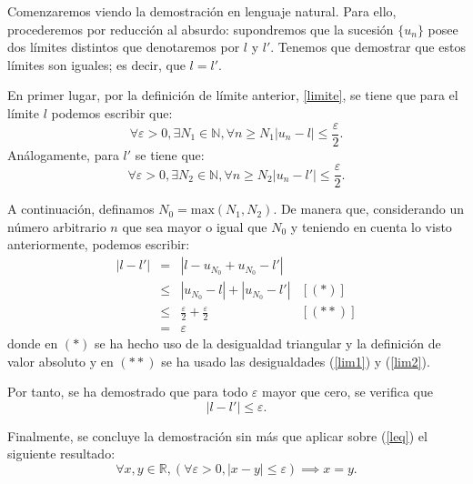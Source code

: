 \begin{demostracion}
  Comenzaremos viendo la demostración en lenguaje natural. Para ello,
  procederemos por reducción al absurdo: supondremos que la sucesión
  \(\{u_n\}\) posee dos límites distintos que denotaremos por \(l\)
  y \(l'\). Tenemos que demostrar que estos límites son iguales;
  es decir, que \(l=l'\).

  En primer lugar, por la definición de límite anterior, \ref{limite},
  se tiene que para el límite \(l\) podemos escribir que:
  \begin{equation}\label{lim1}
    ∀ ε > 0, ∃ N_1 ∈ ℕ, ∀ n ≥ N_1 |u_n-l| ≤ \frac{ε}{2}.
  \end{equation}
  Análogamente, para \(l'\) se tiene que:
  \begin{equation}\label{lim2}
    ∀ ε > 0, ∃ N_2 ∈ ℕ, ∀ n ≥ N_2 |u_n-l'| ≤ \frac{ε}{2}.
  \end{equation}

  A continuación, definamos \(N_0 = \text{max} (N_1,N_2)\).
  De manera que, considerando un número arbitrario \(n\) que
  sea mayor o igual que \(N_0\) y teniendo en cuenta lo visto anteriormente,
  podemos escribir:
  \[\begin{array}{llll}
      |l-l'| &= &|l-u_{N_0}+u_{N_0}-l'|   & \\
             &≤ &|u_{N_0}-l|+|u_{N_0}-l'| & [(*)] \\
             &≤ &\frac{ε}{2}+\frac{ε}{2} & [(**)] \\
             &= &ε
  \end{array}\]
  donde en \((*)\) se ha hecho uso de la desigualdad triangular y la
  definición de valor absoluto y en \((**)\) se ha usado las
  desigualdades (\ref{lim1}) y (\ref{lim2}).

  Por tanto, se ha demostrado que para todo \(ε\) mayor que cero, se
  verifica que
  \begin{equation}\label{leq}
    |l-l'| ≤ ε.
  \end{equation}

  Finalmente, se concluye la demostración sin más que aplicar sobre
  (\ref{leq}) el siguiente resultado:
  \begin{equation}
    ∀ x,y ∈ ℝ,  (∀ ε > 0, |x-y| ≤ ε) ⟹ x=y.
  \end{equation}
\end{demostracion}

